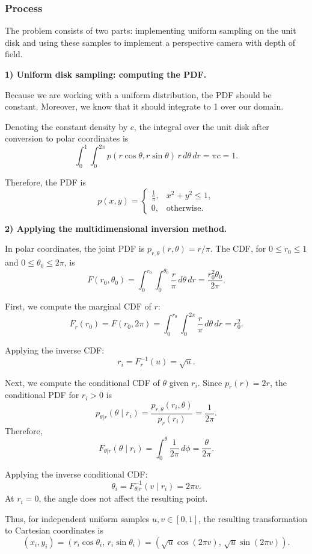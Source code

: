 \subsubsection*{Process}

The problem consists of two parts: implementing uniform sampling on
the unit disk and using these samples to implement a perspective
camera with depth of field.

\textbf{1) Uniform disk sampling: computing the PDF.}

Because we are working with a uniform distribution, the PDF should
be constant. Moreover, we know that it should integrate to 1 over
our domain.

Denoting the constant density by $c$, the integral over the unit disk
after conversion to polar coordinates is
\[
\int_0^1 \int_0^{2\pi}
p(r\cos\theta,r\sin\theta)\,r\,d\theta\,dr
= \pi c = 1.
\]

Therefore, the PDF is
\[
p(x,y) =
\begin{cases}
\frac{1}{\pi}, & x^2 + y^2 \leq 1,\\
0, & \text{otherwise}.
\end{cases}
\]

\textbf{2) Applying the multidimensional inversion method.}

In polar coordinates, the joint PDF is
$p_{r,\theta}(r,\theta)=r/\pi$.
The CDF, for $0\leq r_0\leq 1$ and $0\leq\theta_0\leq 2\pi$, is
\[
F(r_0,\theta_0)
= \int_0^{r_0} \int_0^{\theta_0}
\frac{r}{\pi}\,d\theta\,dr
= \frac{r_0^2\theta_0}{2\pi}.
\]

First, we compute the marginal CDF of $r$:
\[
F_r(r_0) = F(r_0,2\pi)
= \int_0^{r_0} \int_0^{2\pi}
\frac{r}{\pi}\,d\theta\,dr
= r_0^2.
\]

Applying the inverse CDF:
\[
r_i = F_r^{-1}(u) = \sqrt{u}.
\]

Next, we compute the conditional CDF of $\theta$ given $r_i$.
Since $p_r(r)=2r$, the conditional PDF for $r_i>0$ is
\[
p_{\theta|r}(\theta\mid r_i)
= \frac{p_{r,\theta}(r_i,\theta)}{p_r(r_i)}
= \frac{1}{2\pi}.
\]
Therefore,
\[
F_{\theta|r}(\theta\mid r_i)
= \int_0^\theta \frac{1}{2\pi}\,d\phi
= \frac{\theta}{2\pi}.
\]

Applying the inverse conditional CDF:
\[
\theta_i = F_{\theta|r}^{-1}(v\mid r_i) = 2\pi v.
\]
At $r_i=0$, the angle does not affect the resulting point.

Thus, for independent uniform samples $u,v\in[0,1]$, the resulting
transformation to Cartesian coordinates is
\[
\boxed{
(x_i,y_i)
= (r_i\cos\theta_i,\,r_i\sin\theta_i)
= \left(\sqrt{u}\cos(2\pi v),\,\sqrt{u}\sin(2\pi v)\right).
}
\]

